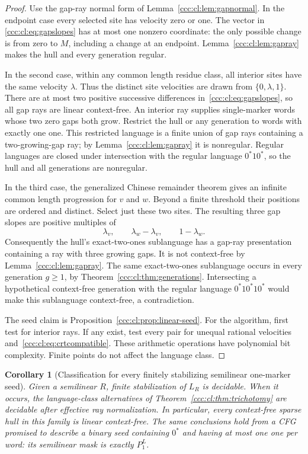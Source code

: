 \documentclass[11pt,letterpaper]{article}
\newtheorem{corollary}[theorem]{Corollary}
\theoremstyle{definition}
\theoremstyle{remark}
\begin{document}
\begin{proof}
Use the gap-ray normal form of Lemma~\ref{ccc:cl:lem:gapnormal}. In the endpoint
case every selected site has velocity zero or one. The vector in
\eqref{ccc:cl:eq:gapslopes} has at most one nonzero coordinate: the only possible
change is from zero to $M$, including a change at an endpoint.
Lemma~\ref{ccc:cl:lem:gapray} makes the hull and every generation regular.

In the second case, within any common length residue class, all interior
sites have the same velocity $\lambda$. Thus the distinct site velocities
are drawn from $\{0,\lambda,1\}$. There are at most two positive successive
differences in~\eqref{ccc:cl:eq:gapslopes}, so all gap rays are linear
context-free. An interior ray supplies single-marker words whose two
zero gaps both grow. Restrict the hull or any generation to words with
exactly one one. This restricted language is a finite union of gap rays
containing a two-growing-gap ray; by Lemma~\ref{ccc:cl:lem:gapray} it is
nonregular. Regular languages are closed under intersection with the
regular language $0^*1 0^*$, so the hull and all generations are
nonregular.

In the third case, the generalized Chinese remainder theorem gives an
infinite common length progression for $v$ and $w$. Beyond a finite
threshold their positions are ordered and distinct. Select just these
two sites. The resulting three gap slopes are positive multiples of
\[
 \lambda_v,\qquad \lambda_w-\lambda_v,\qquad 1-\lambda_w.
\]
Consequently the hull's exact-two-ones sublanguage has a gap-ray
presentation containing a ray with three growing gaps. It is not
context-free by Lemma~\ref{ccc:cl:lem:gapray}. The same exact-two-ones
sublanguage occurs in every generation $g\ge1$, by
Theorem~\ref{ccc:cl:thm:generations}. Intersecting a hypothetical context-free
generation with the regular language $0^*1 0^*1 0^*$ would make this
sublanguage context-free, a contradiction.

The seed claim is Proposition~\ref{ccc:cl:prop:linear-seed}. For the algorithm,
first test for interior rays. If any exist, test every pair for unequal
rational velocities and~\eqref{ccc:cl:eq:crtcompatible}. These arithmetic
operations have polynomial bit complexity. Finite points do not affect
the language class.
\end{proof}

\begin{corollary}[Classification for every finitely stabilizing semilinear
one-marker seed]\label{ccc:cl:cor:fullsparse}
Given a semilinear $R$, finite stabilization of $L_R$ is decidable. When
it occurs, the language-class alternatives of
Theorem~\ref{ccc:cl:thm:trichotomy} are decidable after effective ray
normalization. In particular, every context-free sparse hull in this
family is linear context-free. The same conclusions hold from a CFG
promised to describe a binary seed containing $0^*$ and having at most
one one per word: its semilinear mask is exactly $P_1^L$.
\end{corollary}
\end{document}
